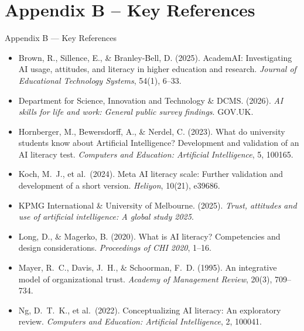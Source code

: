 \documentclass[10pt,aspectratio=169]{beamer}
\begin{document}
\section{Appendix B -- Key References}

\begin{frame}{Appendix B --- Key References}
  \scriptsize
  \begin{itemize}
    \item Brown, R., Sillence, E., \& Branley-Bell, D. (2025). AcademAI: Investigating AI usage,
          attitudes, and literacy in higher education and research.
          \textit{Journal of Educational Technology Systems}, 54(1), 6--33.

    \item Department for Science, Innovation and Technology \& DCMS. (2026).
          \textit{AI skills for life and work: General public survey findings}. GOV.UK.

    \item Hornberger, M., Bewersdorff, A., \& Nerdel, C. (2023). What do university students know
          about Artificial Intelligence? Development and validation of an AI literacy test.
          \textit{Computers and Education: Artificial Intelligence}, 5, 100165.

    \item Koch, M.\ J., et al.\ (2024). Meta AI literacy scale: Further validation and development
          of a short version. \textit{Heliyon}, 10(21), e39686.

    \item KPMG International \& University of Melbourne. (2025).
          \textit{Trust, attitudes and use of artificial intelligence: A global study 2025}.

    \item Long, D., \& Magerko, B. (2020). What is AI literacy? Competencies and design
          considerations. \textit{Proceedings of CHI 2020}, 1--16.

    \item Mayer, R.\ C., Davis, J.\ H., \& Schoorman, F.\ D. (1995). An integrative model of
          organizational trust. \textit{Academy of Management Review}, 20(3), 709--734.

    \item Ng, D.\ T.\ K., et al.\ (2022). Conceptualizing AI literacy: An exploratory review.
          \textit{Computers and Education: Artificial Intelligence}, 2, 100041.


\end{itemize}
\end{frame}
\end{document}

